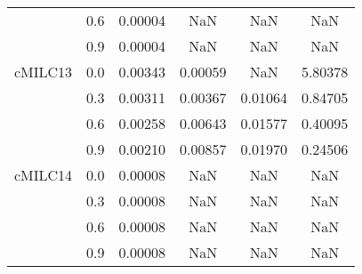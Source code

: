 \begin{longtable}{cccccc}
        & 0.6 & 0.00004 & NaN & NaN & NaN \\
        & 0.9 & 0.00004 & NaN & NaN & NaN \\
cMILC13 & 0.0 & 0.00343 & 0.00059 & NaN & 5.80378 \\
        & 0.3 & 0.00311 & 0.00367 & 0.01064 & 0.84705 \\
        & 0.6 & 0.00258 & 0.00643 & 0.01577 & 0.40095 \\
        & 0.9 & 0.00210 & 0.00857 & 0.01970 & 0.24506 \\
cMILC14 & 0.0 & 0.00008 & NaN & NaN & NaN \\
        & 0.3 & 0.00008 & NaN & NaN & NaN \\
        & 0.6 & 0.00008 & NaN & NaN & NaN \\
        & 0.9 & 0.00008 & NaN & NaN & NaN \\
\end{longtable}

